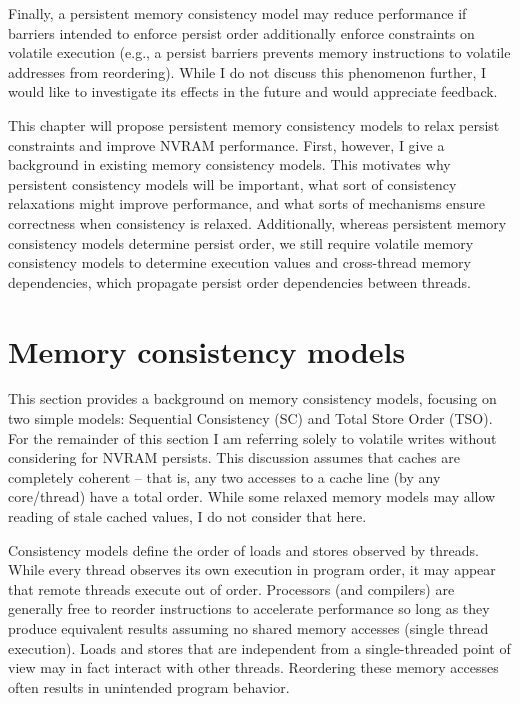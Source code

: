 Finally, a persistent memory consistency model may reduce performance if barriers intended to enforce persist order additionally enforce constraints on volatile execution (e.g., a persist barriers prevents memory instructions to volatile addresses from reordering).
While I do not discuss this phenomenon further, I would like to investigate its effects in the future and would appreciate feedback.

This chapter will propose persistent memory consistency models to relax persist constraints and improve NVRAM performance.
First, however, I give a background in existing memory consistency models.
This motivates why persistent consistency models will be important, what sort of consistency relaxations might improve performance, and what sorts of mechanisms ensure correctness when consistency is relaxed.
Additionally, whereas persistent memory consistency models determine persist order, we still require volatile memory consistency models to determine execution values and cross-thread memory dependencies, which propagate persist order dependencies between threads.

\section{Memory consistency models}
\label{sec:PMC:MemoryConsistency}

This section provides a background on memory consistency models, focusing on two simple models: Sequential Consistency (SC) and Total Store Order (TSO).
For the remainder of this section I am referring solely to volatile writes without considering for NVRAM persists.
This discussion assumes that caches are completely coherent -- that is, any two accesses to a cache line (by any core/thread) have a total order.
While some relaxed memory models may allow reading of stale cached values, I do not consider that here.

Consistency models define the order of loads and stores observed by threads.
While every thread observes its own execution in program order, it may appear that remote threads execute out of order.
Processors (and compilers) are generally free to reorder instructions to accelerate performance so long as they produce equivalent results assuming no shared memory accesses (single thread execution).
Loads and stores that are independent from a single-threaded point of view may in fact interact with other threads.
Reordering these memory accesses often results in unintended program behavior.

